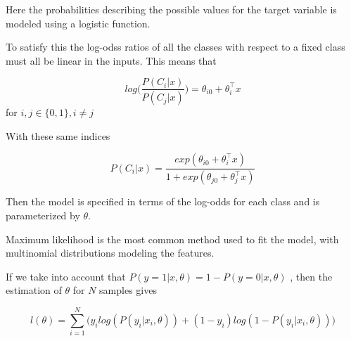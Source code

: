 Here the probabilities describing the possible values for the target variable is modeled using a logistic function.

To satisfy this the log-odss ratios of all the classes with respect to a fixed class must all be linear in the inputs. This means that

$$ log\big( \frac{P(C_i|x)}{P(C_j|x)}\big) = \theta_{i0}  + \theta_i^\intercal x  $$ for $i,j \in \{0,1\}, i\neq j$ \label{logit-logOddss}

With these same indices 

$$ P(C_i|x) = \frac{ exp(\theta_{i0}  + \theta_i^\intercal x)}{1 + exp(\theta_{j0}  + \theta_j^\intercal x)}   $$ 

Then the model is specified in terms of the log-odds for each class and is parameterized by $\theta$.

Maximum likelihood is the most common method used to fit the model, with multinomial distributions modeling the features. 


If we take into account that $P(y=1|x,\theta) = 1 - P(y=0|x,\theta)$ , then the estimation of $\theta$ for $N$ samples gives

\[
l(\theta) = \sum_{i=1}^N \big(y_i log(P(y_i|x_i,\theta)) + (1-y_i)log(1 - P(y_i|x_i,\theta)) \big)
\]


\textit{}
\textit{}
\textit{}
\textit{}

\textit{} 
